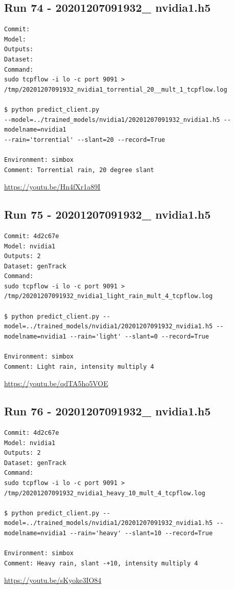 \subsection{Run 74 - 20201207091932\_ nvidia1.h5}
\begin{verbatim}
Commit: 
Model: 
Outputs: 
Dataset: 
Command:
sudo tcpflow -i lo -c port 9091 >
/tmp/20201207091932_nvidia1_torrential_20__mult_1_tcpflow.log

$ python predict_client.py
--model=../trained_models/nvidia1/20201207091932_nvidia1.h5 --modelname=nvidia1
--rain='torrential' --slant=20 --record=True

Environment: simbox
Comment: Torrential rain, 20 degree slant
\end{verbatim}
\url{https://youtu.be/Hn4fXr1a89I}


\subsection{Run 75 - 20201207091932\_ nvidia1.h5 }
\begin{verbatim}
Commit: 4d2c67e
Model: nvidia1
Outputs: 2
Dataset: genTrack
Command:
sudo tcpflow -i lo -c port 9091 > /tmp/20201207091932_nvidia1_light_rain_mult_4_tcpflow.log

$ python predict_client.py --model=../trained_models/nvidia1/20201207091932_nvidia1.h5 --modelname=nvidia1 --rain='light' --slant=0 --record=True

Environment: simbox
Comment: Light rain, intensity multiply 4
\end{verbatim}
\url{https://youtu.be/qdTA5ho5VOE}

\subsection{Run 76 - 20201207091932\_ nvidia1.h5 }
\begin{verbatim}
Commit: 4d2c67e
Model: nvidia1
Outputs: 2
Dataset: genTrack
Command:
sudo tcpflow -i lo -c port 9091 > /tmp/20201207091932_nvidia1_heavy_10_mult_4_tcpflow.log

$ python predict_client.py --model=../trained_models/nvidia1/20201207091932_nvidia1.h5 --modelname=nvidia1 --rain='heavy' --slant=10 --record=True

Environment: simbox
Comment: Heavy rain, slant -+10, intensity multiply 4
\end{verbatim}
\url{https://youtu.be/sKyoke3IO84}

